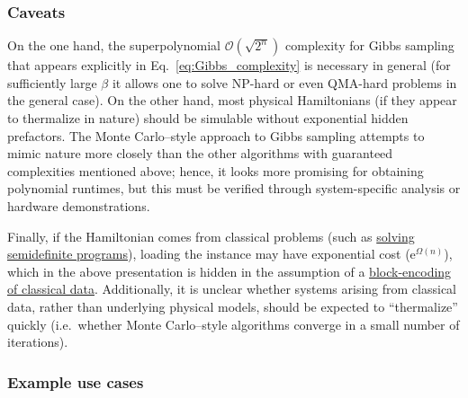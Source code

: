 \begin{refsection}


\subsubsection*{Caveats}

On the one hand, the superpolynomial $\mathcal{O}(\sqrt{2^n})$ complexity for Gibbs sampling that appears explicitly in Eq.~\eqref{eq:Gibbs_complexity} is necessary in general (for sufficiently large $\beta$ it allows one to solve NP-hard or even QMA-hard problems in the general case). On the other hand, most physical Hamiltonians (if they appear to thermalize in nature) should be simulable without exponential hidden prefactors.
The Monte Carlo--style approach to Gibbs sampling attempts to mimic nature more closely than the other algorithms with guaranteed complexities mentioned above; hence, it looks more promising for obtaining polynomial runtimes, but this must be verified through system-specific analysis or hardware demonstrations.


Finally, if the Hamiltonian comes from classical problems (such as \hyperref[appl:ConicProgramming]{solving semidefinite programs}), loading the instance may have exponential cost ($\mathrm{e}^{\Omega(n)}$), which in the above presentation is hidden in the assumption of a \hyperref[prim:BlockEncodingsClassical]{block-encoding of classical data}. Additionally, it is unclear whether systems arising from classical data, rather than underlying physical models, should be expected to ``thermalize'' quickly (i.e.~whether Monte Carlo--style algorithms converge in a small number of iterations).



\subsubsection*{Example use cases}


\end{refsection}
